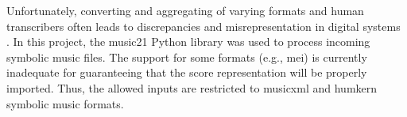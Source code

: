 

Unfortunately, converting and aggregating of varying formats
and human transcribers often leads to discrepancies and
misrepresentation in digital systems
\parencite{napoleslopez2018encoding,
napoleslopez2019effects}. In this project, the music21
Python library \parencite{cuthbert2010music21} was used to
process incoming symbolic music files. The support for some
formats (e.g., \gls{mei}) is currently inadequate for
guaranteeing that the score representation will be properly
imported. Thus, the allowed inputs are restricted to
\gls{musicxml} and \gls{humkern} symbolic music formats.